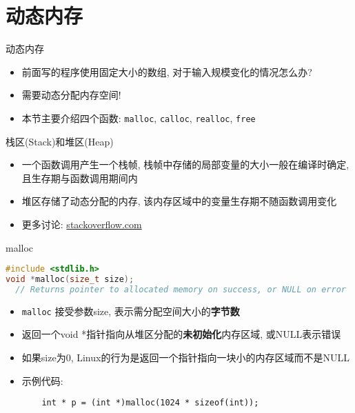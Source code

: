 \section{动态内存}\label{sec:动态内存}

\begin{frame}[fragile]{动态内存}
    \begin{itemize}[<+- | alert@+>]
        \item 前面写的程序使用固定大小的数组, 对于输入规模变化的情况怎么办?
        \item 需要动态分配内存空间!
        \item 本节主要介绍四个函数: \texttt{malloc}, \texttt{calloc}, \texttt{realloc}, \texttt{free}
    \end{itemize}
\end{frame}

\begin{frame}[fragile]{栈区(Stack)和堆区(Heap)}
    \begin{itemize}[<+- | alert@+>]
        \item 一个函数调用产生一个栈帧, 栈帧中存储的局部变量的大小一般在编译时确定, 且生存期与函数调用期间内
        \item 堆区存储了动态分配的内存, 该内存区域中的变量生存期不随函数调用变化
        \item 更多讨论: \href{https://stackoverflow.com/questions/79923/what-and-where-are-the-stack-and-heap}{stackoverflow.com}
    \end{itemize}
\end{frame}

\begin{frame}[fragile]{malloc}
    \scriptsize\begin{lstlisting}[language=c]
#include <stdlib.h>
void *malloc(size_t size);
  // Returns pointer to allocated memory on success, or NULL on error
    \end{lstlisting}
    \normalsize
    \begin{itemize}[<+- | alert@+>]
        \item \texttt{malloc} 接受参数size, 表示需分配空间大小的\textbf{字节数}
        \item 返回一个void *指针指向从堆区分配的\textbf{未初始化}内存区域, 或NULL表示错误
        \item 如果size为0, Linux的行为是返回一个指针指向一块小的内存区域而不是NULL
        \item 示例代码:
        \scriptsize\begin{verbatim}
    int * p = (int *)malloc(1024 * sizeof(int));
        \end{verbatim}
    \end{itemize}
\end{frame}

